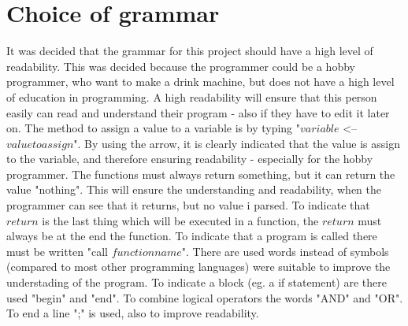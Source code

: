 
\section{Choice of grammar}
It was decided that the grammar for this project should have a high level of readability. This was decided because the programmer could be a hobby programmer, who want to make a drink machine, but does not have a high level of education in programming. A high readability will ensure that this person easily can read and understand their program - also if they have to edit it later on. The method to assign a value to a variable is by typing "$variable$ <-- $value to assign$". By using the arrow, it is clearly indicated that the value is assign to the variable, and therefore ensuring readability - especially for the hobby programmer.
The functions must always return something, but it can return the value "nothing". This will ensure the understanding and readability, when the programmer can see that it returns, but no value i parsed. To indicate that $return$ is the last thing which will be executed in a function, the $return$ must always be at the end the function. To indicate that a program is called there must be written "call $functionname$".
There are used words instead of symbols (compared to most other programming languages) were suitable to improve the understading of the program. To indicate a block (eg. a if statement) are there used "begin" and "end". To combine logical operators the words "AND" and "OR". To end a line ";" is used, also to improve readability.